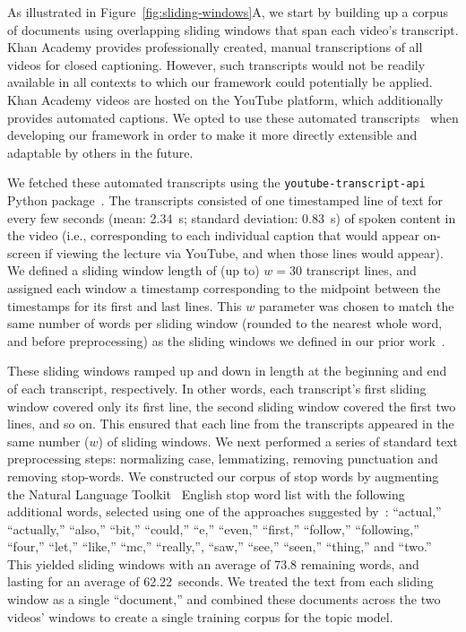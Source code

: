\documentclass[10pt]{article}
\begin{document}
As illustrated in Figure~\ref{fig:sliding-windows}A, we start by building up a
corpus of documents using overlapping sliding windows that span each video's
transcript. Khan Academy provides professionally created, manual transcriptions
of all videos for closed captioning. However, such transcripts would not be
readily available in all contexts to which our framework could potentially be
applied. Khan Academy videos are hosted on the YouTube platform, which
additionally provides automated captions. We opted to use these automated
transcripts~\citep[which, in prior work, we have found to be of sufficiently
near-human quality to yield reliable data in behavioral
studies; ][]{ZimaEtal18} when developing our framework in order to make
it more directly extensible and adaptable by others in the future.

We fetched these automated transcripts using the
\texttt{youtube-transcript-api} Python package~\citep{Depo18}. The transcripts
consisted of one timestamped line of text for every few seconds (mean: 2.34~s;
standard deviation: 0.83~s) of spoken content in the video (i.e., corresponding
to each individual caption that would appear on-screen if viewing the lecture
via YouTube, and when those lines would appear). We defined a sliding window
length of (up to) $w = 30$ transcript lines, and assigned each window a
timestamp corresponding to the midpoint between the timestamps for its first
and last lines. This $w$ parameter was chosen to match the same number of words
per sliding window (rounded to the nearest whole word, and before
preprocessing) as the sliding windows we defined in our prior
work~\citep[][i.e., 185 words per sliding window]{HeusEtal21}.

These sliding windows ramped up and down in length at the beginning and end of
each transcript, respectively. In other words, each transcript's first sliding
window covered only its first line, the second sliding window covered the first
two lines, and so on. This ensured that each line from the transcripts appeared
in the same number ($w$) of sliding windows. We next performed a series of
standard text preprocessing steps: normalizing case, lemmatizing, removing
punctuation and removing stop-words. We constructed our corpus of stop words by
augmenting the Natural Language Toolkit~\citep[NLTK; ][]{BirdEtal09} English
stop word list with the following additional words, selected using one of the
approaches suggested by~\citep{BoydEtal14}: ``actual,'' ``actually,'' ``also,''
``bit,'' ``could,'' ``e,'' ``even,'' ``first,'' ``follow,'' ``following,''
``four,'' ``let,'' ``like,'' ``mc,'' ``really,'', ``saw,'' ``see,'' ``seen,''
``thing,'' and ``two.'' This yielded sliding windows with an average of 73.8
remaining words, and lasting for an average of 62.22~seconds. We treated the
text from each sliding window as a single ``document,'' and combined these
documents across the two videos' windows to create a single training corpus for
the topic model.
\end{document}
